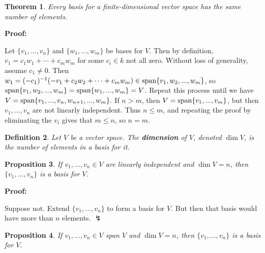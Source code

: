 \documentclass{article}
\theoremstyle{colontheorem}
\newtheorem{theorem}{Theorem}[section]
\newtheorem{proposition}[theorem]{Proposition}
\newtheorem{definition}[theorem]{Definition}
\newcommand{\Span}{\textnormal{span}}
\newenvironment{Theorem}
{
	\begin{mdframed}[backgroundcolor=TheoremOrange!10]
	\begin{theorem}
}
{
	\end{theorem}
	\end{mdframed}
	
	\vspace{.15in}
}
\newenvironment{Proposition}
{
	\begin{mdframed}[backgroundcolor=TheoremOrange!10]
	\begin{proposition}
}
{
	\end{proposition}
	\end{mdframed}
	
	\vspace{.15in}
}
\newenvironment{Def}
{
	\begin{mdframed}[backgroundcolor=DefGreen!10]
	\begin{definition}
}
{
	\end{definition}
	\end{mdframed}
	
	\vspace{.15in}
}
\newenvironment{Proof}
{
	\vspace{-.3in}
	
	\begin{mdframed}[backgroundcolor=ProofPurple!10]
	\textbf{Proof:}%
}
{
	\end{mdframed}
	
	\vspace{.15in}
}
\begin{document}
\begin{Theorem}
	
	Every basis for a finite-dimensional vector space has the same number of elements.
	
\end{Theorem}



\begin{Proof}
	Let $\{v_1, ..., v_n\}$ and $\{w_1, ..., w_m\}$ be bases for $V$. Then by definition, $v_1 = c_1 w_1 + \cdots + c_m w_m$ for some $c_i \in k$ not all zero. Without loss of generality, assume $c_1 \neq 0$. Then $w_1 = (-c_1)^{-1}(-v_1 + c_2 w_2 + \cdots + c_m w_m) \in \Span \{v_1, w_2, ..., w_m\}$, so $\Span \{v_1, w_2, ..., w_m\} = \Span \{w_1, ..., w_m\} = V$. Repeat this process until we have $V = \Span \{v_1, ..., v_n, w_{n+1}, ..., w_m\}.$ If $n > m$, then $V = \Span \{v_1, ..., v_m\}$, but then $v_1, ..., v_n$ are not linearly independent. Thus $n \leq m$, and repeating the proof by eliminating the $v_i$ gives that $m \leq n$, so $n = m$.
	
\end{Proof}



\begin{Def}
	
	Let $V$ be a vector space. The \textbf{dimension} of $V$, denoted $\dim V$, is the number of elements in a basis for it.
	
\end{Def}



\begin{Proposition}
	
	If $v_1, ..., v_n \in V$ are linearly independent and $\dim V = n$, then $\{v_1, ..., v_n\}$ is a basis for $V$.
	
\end{Proposition}



\begin{Proof}
	Suppose not. Extend $\{v_1, ..., v_n\}$ to form a basis for $V$. But then that basis would have more than $n$ elements. $\lightning$
\end{Proof}



\begin{Proposition}
	
	If $v_1, ..., v_n \in V$ span $V$ and $\dim V = n$, then $\{v_1, ..., v_n\}$ is a basis for $V$.
	
\end{Proposition}
\end{document}
